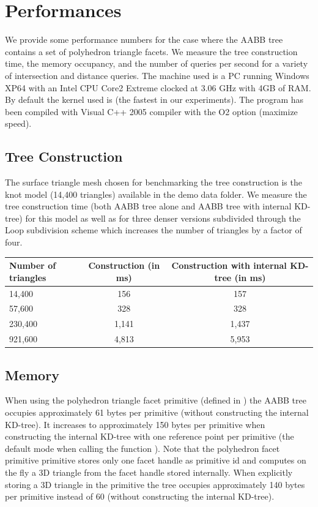 \section{Performances}
\label{AABB_tree_section_performances}

We provide some performance numbers for the case where the AABB tree contains a set of polyhedron triangle facets. We measure the tree construction time, the memory occupancy, and the number of queries per second for a variety of intersection and distance queries. The machine used is a PC running Windows XP64 with an Intel CPU Core2 Extreme clocked at 3.06 GHz with 4GB of RAM. By default the kernel used is  (the fastest in our experiments). The program has been compiled with Visual C++ 2005 compiler with the O2 option (maximize speed).



\subsection{Tree Construction}

The surface triangle mesh chosen for benchmarking the tree construction is the knot model (14,400 triangles) available in the demo data folder. We measure the tree construction time (both AABB tree alone and AABB tree with internal KD-tree)  for this model as well as for three denser versions subdivided through the Loop subdivision scheme which increases the number of triangles by a factor of four.

\begin{tabular}{|l|c|c|}
  \hline
  Number of triangles & Construction (in ms) & Construction with internal KD-tree (in ms)\\
  \hline
   14,400 &   156 &   157 \\
   57,600 &   328 &   328 \\
  230,400 & 1,141 & 1,437 \\
  921,600 & 4,813 & 5,953 \\
  \hline
\end{tabular}



\subsection{Memory}

When using the polyhedron triangle facet primitive (defined in ) the AABB tree occupies approximately 61 bytes per primitive (without constructing the internal KD-tree). It increases to approximately 150 bytes per primitive when constructing the internal KD-tree with one reference point per primitive (the default mode when calling the function ). Note that the polyhedron facet primitive primitive stores only one facet handle as primitive id and computes on the fly a 3D triangle from the facet handle stored internally. When explicitly storing a 3D triangle in the primitive the tree occupies approximately 140 bytes per primitive instead of 60 (without constructing the internal KD-tree).\\

